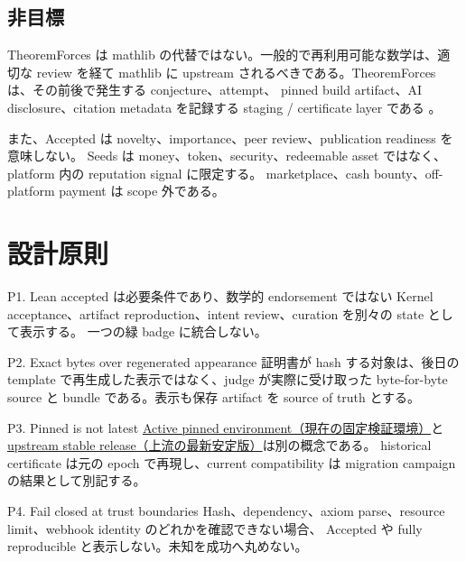 \documentclass[a4paper,11pt]{ltjsarticle}
\newcommand{\glossref}[2]{\hyperlink{glossary:#1}{#2}}
\begin{document}
\subsection{非目標}

TheoremForces は mathlib の代替ではない。一般的で再利用可能な数学は、適切な review を経て
mathlib に upstream されるべきである。TheoremForces は、その前後で発生する conjecture、attempt、
pinned build artifact、AI disclosure、citation metadata を記録する staging / certificate layer である
\cite{tfabout,mathlib}。

また、Accepted は novelty、importance、peer review、publication readiness を意味しない。
Seeds は money、token、security、redeemable asset ではなく、platform 内の reputation signal に限定する。
marketplace、cash bounty、off-platform payment は scope 外である\cite{tfabout,tfpricing}。

\section{設計原則}

\begin{principlebox}{P1. Lean accepted は必要条件であり、数学的 endorsement ではない}
Kernel acceptance、artifact reproduction、intent review、curation を別々の state として表示する。
一つの緑 badge に統合しない。
\end{principlebox}

\begin{principlebox}{P2. Exact bytes over regenerated appearance}
証明書が hash する対象は、後日の template で再生成した表示ではなく、judge が実際に受け取った
byte-for-byte source と bundle である。表示も保存 artifact を source of truth とする。
\end{principlebox}

\begin{principlebox}{P3. Pinned is not latest}
\glossref{active-pinned-environment}{Active pinned environment（現在の固定検証環境）}と
\glossref{upstream-stable-release}{upstream stable release（上流の最新安定版）}は別の概念である。
historical certificate は元の epoch で再現し、current compatibility は migration campaign の結果として別記する。
\end{principlebox}

\begin{principlebox}{P4. Fail closed at trust boundaries}
Hash、dependency、axiom parse、resource limit、webhook identity のどれかを確認できない場合、
Accepted や fully reproducible と表示しない。未知を成功へ丸めない。
\end{principlebox}
\end{document}
